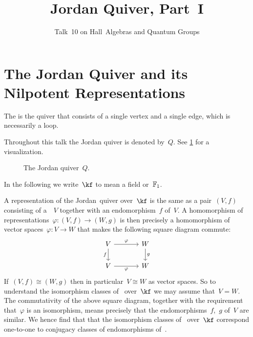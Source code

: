 \documentclass[a4paper,11pt]{scrartcl}
\title{Jordan Quiver, Part~I}
\subtitle{Talk~10 on Hall~Algebras and Quantum Groups}
\author{}
\date{}
\begin{document}
\maketitle

\vspace{-4em}





\section{The Jordan Quiver and its Nilpotent Representations}

\begin{definition}
  The  is the quiver that consists of a single vertex and a single edge, which is necessarily a loop.
\end{definition}

Throughout this talk the Jordan quiver is denoted by~$Q$.
See \cref{jordan quiver} for a visualization.
\begin{figure}[tb]
  \centering
  \caption{The Jordan quiver~$Q$.}
  \label{jordan quiver}
\end{figure}
In the following we write~$\kf$ to mean a field or~$\mathbb{F}_1$.

A representation of the Jordan~quiver over~$\kf$ is the same as a pair~$(V,f)$ consisting of a~\vectorspace{$\kf$}~$V$ together with an endomorphism~$f$ of~$V$.
A homomorphism of representations~$\varphi \colon (V,f) \to (W,g)$ is then precisely a homomorphism of vector spaces~$\varphi \colon V \to W$ that makes the following square diagram commute:
\[
  \begin{tikzcd}[column sep = large]
    V
    \arrow{r}[above]{\varphi}
    \arrow{d}[left]{f}
    &
    W
    \arrow{d}[right]{g}
    \\
    V
    \arrow{r}[below]{\varphi}
    &
    W
  \end{tikzcd}
\]
If~$(V, f) \cong (W, g)$ then in particular~$V \cong W$ as vector spaces.
So to understand the isomorphism classes of~ over~$\kf$ we may assume that~$V = W$.
The commutativity of the above square diagram, together with the requirement that~$\varphi$ is an isomorphism, means precisely that the endomorphisms~$f$,~$g$ of~$V$ are similar.
We hence find that that the isomorphism classes of~ over~$\kf$ correspond one-to-one to conjugacy classes of endomorphisms of~\vectorspaces{$\kf$}.
\end{document}
